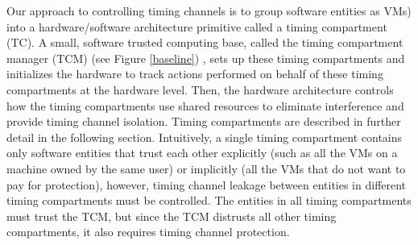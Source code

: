 Our approach to controlling timing channels is to group software entities
as VMs) into a hardware/software architecture primitive called a timing 
compartment (TC). A small, software trusted computing base, called the timing 
compartment manager (TCM) (see Figure \ref{baseline}) , sets up these timing 
compartments and initializes the hardware to track actions performed on behalf 
of these timing compartments at the hardware level.  Then, the hardware 
architecture controls how the timing compartments use shared resources to 
eliminate interference and provide timing channel isolation.  Timing 
compartments are described in further detail in the following section.  
Intuitively, a single timing compartment contains only software entities that 
trust each other explicitly (such as all the VMs on a machine owned by the same 
user) or implicitly (all the VMs that do not want to pay for protection), 
however, timing channel leakage between entities in different timing 
compartments must be controlled. The entities in all timing compartments must 
trust the TCM, but since the TCM distrusts all other timing compartments, it 
also requires timing channel protection.

